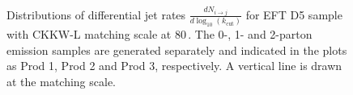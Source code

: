  \begin{figure}[h!]
 	\centering  
 	\hfill
 	\hfill
 	\hfill
   \caption{Distributions of differential jet rates $\frac{dN_{i\to j}}{d \log_{10}(k_\textrm{cut})}$ for EFT D5 sample with CKKW-L matching scale at 80\,\gev. The 0-, 1- and 2-parton emission samples are generated separately and indicated in the plots as Prod 1, Prod 2 and Prod 3, respectively. A vertical line is drawn at the matching scale.}
   \label{fig:CKKW_D5_80}
 \end{figure}


